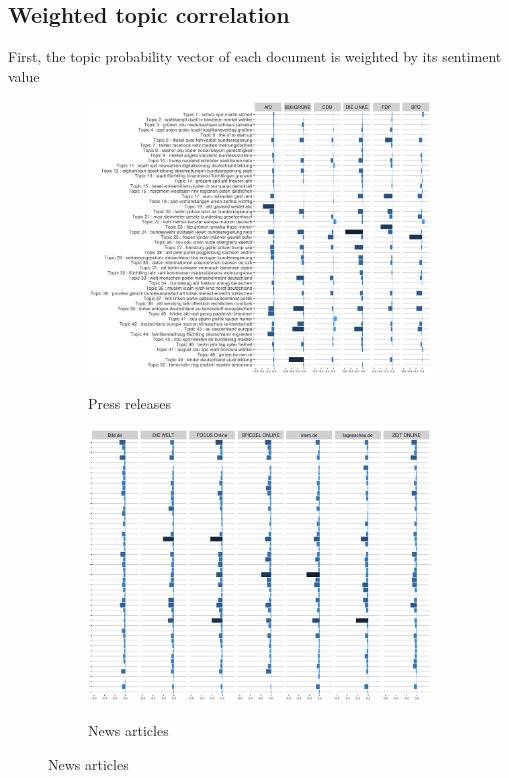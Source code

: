 \documentclass[12pt,a4paper,notitlepage]{article}
\begin{document}


\subsection{Weighted topic correlation}

First, the topic probability vector of each document is weighted by its sentiment value

\begin{figure}[H]
	\begin{center}
	\caption{Weighted topic probability}
		\begin{subfigure}[normla]{0.49\textwidth}
			\caption{Press releases}
			\includegraphics[width=\textwidth]{../figs/topic_sent_press}
			\label{fig_sent_press}
		\end{subfigure}
		\begin{subfigure}[normla]{0.49\textwidth}
			\caption{News articles}
			\includegraphics[width=\textwidth]{../figs/topic_sent_news}
			\label{fig_sent_news}
		\end{subfigure}
	\end{center}
\end{figure}
\end{document}
